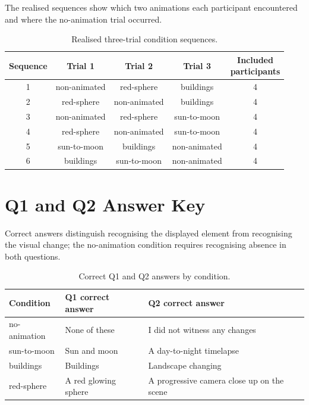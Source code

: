 \documentclass[
english,                 %
bibtex,                  %
includeExtraAbstracts, %
]{kththesis}
\newenvironment{evidenceblock}{\par\addvspace{6pt}\noindent\begin{minipage}{\linewidth}}{\end{minipage}\par\addvspace{6pt}}
\numberwithin{listing}{chapter}
\begin{document}
\begin{evidenceblock}
\normalsize
The realised sequences show which two animations each participant encountered and where the no-animation trial occurred.

\begin{table}[H]
\centering
\caption[Realised three-trial condition sequences]{Realised three-trial condition sequences.}
\label{tab:app-condition-sequences}
\scriptsize
\begin{tabular}{ccccc}
\toprule
Sequence & Trial 1 & Trial 2 & Trial 3 & \shortstack{Included\\participants} \\ \midrule
1 & non-animated & red-sphere & buildings & 4 \\
2 & red-sphere & non-animated & buildings & 4 \\
3 & non-animated & red-sphere & sun-to-moon & 4 \\
4 & red-sphere & non-animated & sun-to-moon & 4 \\
5 & sun-to-moon & buildings & non-animated & 4 \\
6 & buildings & sun-to-moon & non-animated & 4 \\
\bottomrule
\end{tabular}
\end{table}
\end{evidenceblock}

\section{Q1 and Q2 Answer Key}
\label{sec:app-q1-q2-answer-key}

\begin{evidenceblock}
\normalsize
Correct answers distinguish recognising the displayed element from recognising the visual change; the no-animation condition requires recognising absence in both questions.

\begin{table}[H]
\centering
\scriptsize
\caption[Correct Q1 and Q2 answers by condition]{Correct Q1 and Q2 answers by condition.}
\label{tab:app-q1-q2-answer-key}
\begin{tabularx}{\textwidth}{l>{\raggedright\arraybackslash}X>{\raggedright\arraybackslash}X}
\toprule
Condition & Q1 correct answer & Q2 correct answer \\ \midrule
no-animation & None of these & I did not witness any changes \\
sun-to-moon & Sun and moon & A day-to-night timelapse \\
buildings & Buildings & Landscape changing \\
red-sphere & A red glowing sphere & A progressive camera close up on the scene \\
\bottomrule
\end{tabularx}
\end{table}
\end{evidenceblock}
\end{document}
